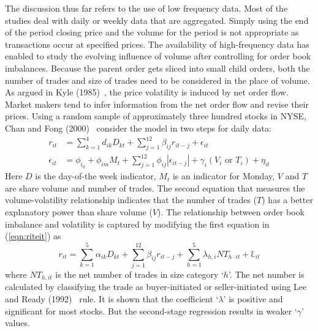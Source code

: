 The discussion thus far refers to the use of low frequency data. Most of the studies deal with daily or weekly data that are aggregated. Simply using the end of the period closing price and the volume for the period is not appropriate as transactions occur at specified prices. The availability of high-frequency data has enabled to study the evolving influence of volume after controlling for order book imbalances. Because the parent order gets sliced into small child orders, both the number of trades and size of trades need to be considered in the place of volume. As argued in Kyle (1985)~\cite{kyle1985}, the price volatility is induced by net order flow. Market makers tend to infer information from the net order flow and revise their prices. Using a random sample of approximately three hundred stocks in NYSE, Chan and Fong (2000)~\cite{chanfong} consider the model in two steps for daily data: 
	\begin{equation}\label{eqn:riteit}
	\begin{split}
	r_{it} &= \sum_{k=1}^4 d_{ik} D_{kt} + \sum_{j=1}^{12} \beta_{ij} r_{it-j} + \epsilon_{it} \\
	\epsilon_{it} &= \phi_{i_0} + \phi_{im} M_t + \sum_{j=1}^{12} \phi_{ij} |\epsilon_{it-j}| + \gamma_i (V_i \text{ or }T_i) + \eta_{it}
	\end{split}
	\end{equation}
Here $D$ is the day-of-the week indicator, $M_t$ is an indicator for Monday, $V$ and $T$ are share volume and number of trades. The second equation that measures the volume-volatility relationship indicates that the number of trades ($T$) has a better explanatory power than share volume ($V$). The relationship between order book imbalance and volatility is captured by modifying the first equation in (\ref{eqn:riteit}) as
	\begin{equation}\label{eqn:rit32}
	r_{it}=\sum_{k=1}^5 \alpha_{ik} D_{kt} + \sum_{j=1}^{12} \beta_{ij} r_{it-j} + \sum_{h=1}^5 \lambda_{h,i} N T_{h\cdot it} + \Eulerconst_{it}
	\end{equation}
where $NT_{h,it}$ is the net number of trades in size category `$h$'. The net number is calculated by classifying the trade as buyer-initiated or seller-initiated using Lee and Ready (1992)~\cite{leeready} rule. It is shown that the coefficient `$\lambda$' is positive and significant for most stocks. But the second-stage regression results in weaker `$\gamma$' values. 


